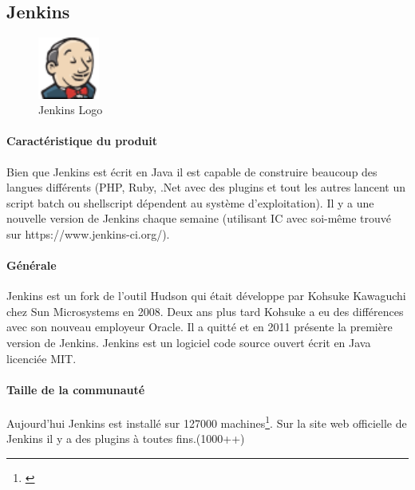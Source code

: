 \newpage




\subsection{Jenkins}
\begin{figure}
  \begin{center}
    \includegraphics[width=0.18\textwidth]{bilder/JENKINS}
  \end{center}
  \caption{Jenkins Logo}
\end{figure}
\paragraph{Caractéristique du produit} Bien que Jenkins est écrit en Java il est capable de construire beaucoup des langues différents (PHP, Ruby, .Net avec des plugins et tout les autres lancent un script batch ou shellscript dépendent au système d'exploitation). Il y a une nouvelle version de Jenkins chaque semaine (utilisant IC avec soi-même trouvé sur https://www.jenkins-ci.org/).

\paragraph{Générale} Jenkins est un fork de l'outil Hudson qui était développe par Kohsuke Kawaguchi chez Sun Microsystems en 2008. Deux ans plus tard Kohsuke a eu des différences avec son nouveau employeur Oracle. Il a quitté et en 2011 présente la première version de Jenkins. Jenkins est un logiciel code source ouvert écrit en Java licenciée MIT. 
\paragraph{Taille de la communauté} Aujourd'hui Jenkins est installé sur 127000 machines\footnote{\citep{jenkinsstats}}. Sur la site web officielle de Jenkins il y a des plugins à toutes fins.(1000++) 
